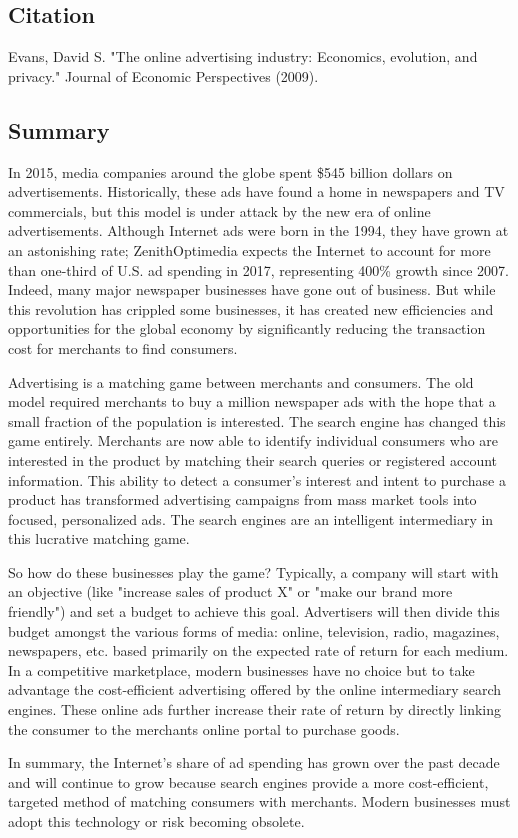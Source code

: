 \documentclass[../summaries.tex]{subfiles}
\begin{document}
\subsection{Citation}
Evans, David S. "The online advertising industry: Economics, evolution, and privacy." Journal of Economic Perspectives (2009).

\subsection{Summary}
In 2015, media companies around the globe spent \$545 billion dollars on advertisements. Historically, these ads have found a home in newspapers and TV commercials, but this model is under attack by the new era of online advertisements. Although Internet ads were born in the 1994, they have grown at an astonishing rate; ZenithOptimedia expects the Internet to account for more than one-third of U.S. ad spending in 2017, representing 400\% growth since 2007. Indeed, many major newspaper businesses have gone out of business. But while this revolution has crippled some businesses, it has created new efficiencies and opportunities for the global economy by significantly reducing the transaction cost for merchants to find consumers.

Advertising is a matching game between merchants and consumers. The old model required merchants to buy a million newspaper ads with the hope that a small fraction of the population is interested. The search engine has changed this game entirely. Merchants are now able to identify individual consumers who are interested in the product by matching their search queries or registered account information. This ability to detect a consumer's interest and intent to purchase a product has transformed advertising campaigns from mass market tools into focused, personalized ads. The search engines are an intelligent intermediary in this lucrative matching game.

So how do these businesses play the game? Typically, a company will start with an objective (like "increase sales of product X" or "make our brand more friendly") and set a budget to achieve this goal. Advertisers will then divide this budget amongst the various forms of media:  online, television, radio, magazines, newspapers, etc. based primarily on the expected rate of return for each medium. In a competitive marketplace, modern businesses have no choice but to take advantage the cost-efficient advertising offered by the online intermediary search engines. These online ads further increase their rate of return by directly linking the consumer to the merchants online portal to purchase goods.

In summary, the Internet's share of ad spending has grown over the past decade and will continue to grow because search engines provide a more cost-efficient, targeted method of matching consumers with merchants. Modern businesses must adopt this technology or risk becoming obsolete.
\end{document}
